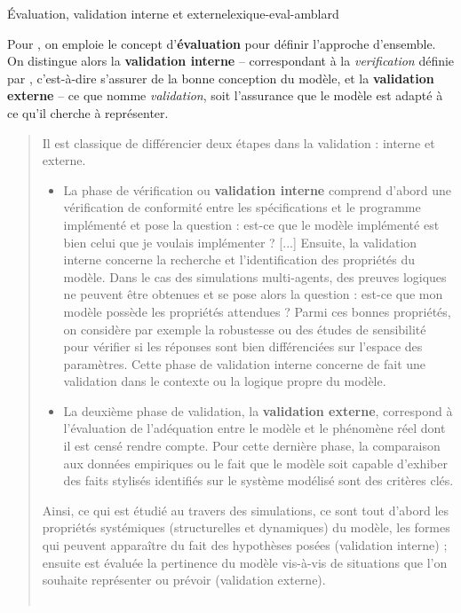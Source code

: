 \begin{encadre}{Évaluation, validation interne et externe}{lexique-eval-amblard}
\renewcommand{\thempfootnote}{\alph{mpfootnote}}

Pour \textcite{amblard_evaluation_2006}, on emploie le concept d'\textbf{évaluation} pour définir l'approche d'ensemble.
On distingue alors la \og \textbf{validation interne}\fg{} -- correspondant à la \textit{verification} définie par \textcite{balci_validation_1994}, c'est-à-dire s'assurer de la bonne conception du modèle, et la \og \textbf{validation externe}\fg{} -- ce que \citeauthor{balci_validation_1994} nomme \textit{validation}, soit l'assurance que le modèle est adapté à ce qu'il cherche à représenter.

\begin{quotation}
\noindent \og Il est classique de différencier deux étapes dans la validation : interne et externe.
\begin{itemize}
	\item La phase de vérification ou \textbf{validation interne} comprend d'abord une vérification de conformité entre les spécifications et le programme implémenté et pose la question : est-ce que le modèle implémenté est bien celui que je voulais implémenter ? [...]
	Ensuite, la validation interne concerne la recherche et l'identification des propriétés du modèle.
	Dans le cas des simulations multi-agents, des preuves logiques ne peuvent être obtenues et se pose alors la question : est-ce que mon modèle possède les propriétés attendues ?
	Parmi ces bonnes propriétés, on considère par exemple la robustesse ou des études de sensibilité pour vérifier si les réponses sont bien différenciées sur l'espace des paramètres.
	Cette phase de validation interne concerne de fait une validation dans le contexte ou la logique propre du modèle.

	\item La deuxième phase de validation, la \textbf{validation externe}, correspond à l'évaluation de l'adéquation entre le modèle et le phénomène réel dont il est censé rendre compte.
	Pour cette dernière phase, la comparaison aux données empiriques ou le fait que le modèle soit capable d'exhiber des faits stylisés identifiés sur le système modélisé sont des critères clés.
\end{itemize}
Ainsi, ce qui est étudié au travers des simulations, ce sont tout d'abord les propriétés systémiques (structurelles et dynamiques) du modèle, les formes qui peuvent apparaître du fait des hypothèses posées (validation interne) ;
ensuite est évaluée la pertinence du modèle vis-à-vis de situations que l'on souhaite représenter ou prévoir (validation externe).\fg{}\\
	\mbox{}~ \hfill \cite[110-111]{amblard_evaluation_2006}
\end{quotation}
\end{encadre}

